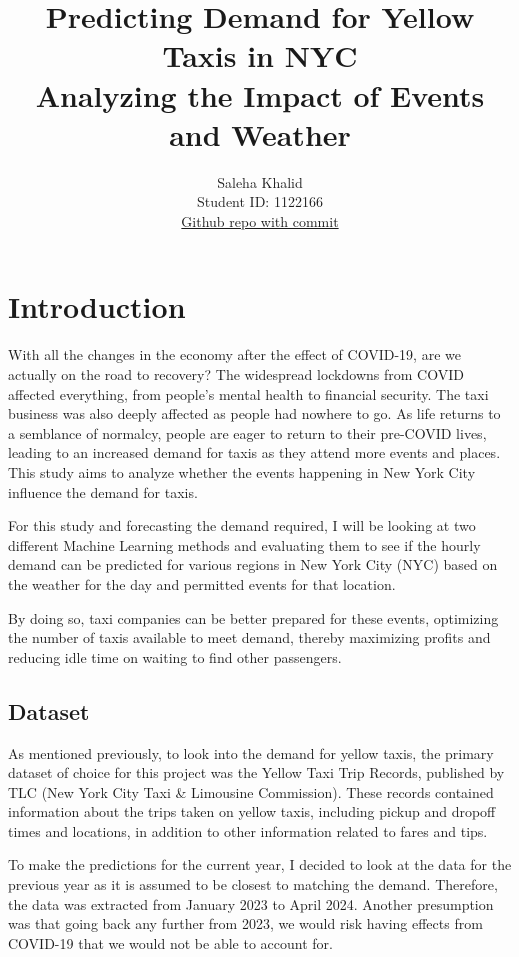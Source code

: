 \documentclass[11pt]{article}
\title{\textbf{Predicting Demand for Yellow Taxis in NYC} \\ Analyzing the Impact of Events and Weather}
\author{
Saleha Khalid \\
Student ID: 1122166 \\
\href{https://github.com/MAST30034-AppliedDataScience/project-1-individual-salehak/commit/eedf6e0d12d302930bc589b1683d2986f6cee033}{Github repo with commit}
}
\begin{document}
\maketitle

\section{Introduction}
With all the changes in the economy after the effect of COVID-19, are we actually on the road to recovery? The widespread lockdowns from COVID affected everything, from people’s mental health to financial security.\cite{covid19effects} The taxi business was also deeply affected as people had nowhere to go. As life returns to a semblance of normalcy, people are eager to return to their pre-COVID lives, leading to an increased demand for taxis as they attend more events and places. This study aims to analyze whether the events happening in New York City influence the demand for taxis. 

For this study and forecasting the demand required, I will be looking at two different Machine Learning methods and evaluating them to see if the hourly demand can be predicted for various regions in New York City (NYC) based on the weather for the day and permitted events for that location.

By doing so, taxi companies can be better prepared for these events, optimizing the number of taxis available to meet demand, thereby maximizing profits and reducing idle time on waiting to find other passengers.

\subsection{Dataset}
As mentioned previously, to look into the demand for yellow taxis, the primary dataset of choice for this project was the Yellow Taxi Trip Records, published by TLC (New York City Taxi \& Limousine Commission).\cite{nyctaxidata} These records contained information about the trips taken on yellow taxis, including pickup and dropoff times and locations, in addition to other information related to fares and tips. 

To make the predictions for the current year, I decided to look at the data for the previous year as it is assumed to be closest to matching the demand. Therefore, the data was extracted from January 2023 to April 2024. Another presumption was that going back any further from 2023, we would risk having effects from COVID-19 that we would not be able to account for.
\end{document}
